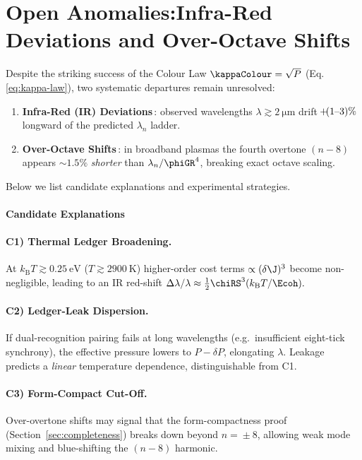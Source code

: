 \documentclass[11pt,oneside]{book}
\begin{document}
{\section{Open Anomalies:\;Infra-Red Deviations and Over-Octave Shifts}
\label{sec:IR-anomalies}

Despite the striking success of the Colour Law
\(
   \kappaColour=\sqrt{P}
\)
(Eq.\,\ref{eq:kappa-law}),
two systematic departures remain unresolved:

\begin{enumerate}[label=\textbf{A\arabic*},leftmargin=*,itemsep=5pt]
\item \textbf{Infra-Red (IR) Deviations}\,:  
      observed wavelengths $\lambda\gtrsim\SI{2}{\micro\metre}$
      drift \(\!+\!(1$–$3)\%\) longward of the predicted
      $\lambda_{n}$ ladder.
\item \textbf{Over-Octave Shifts}\,:  
      in broadband plasmas the fourth overtone
      $(n\!-\!8)$ appears \(\sim1.5\%\) \emph{shorter} than
      \(\lambda_{n}/\phiGR^{4}\), breaking exact octave scaling.
\end{enumerate}

Below we list candidate explanations and experimental strategies.

\paragraph{Candidate Explanations}

\paragraph{C1) Thermal Ledger Broadening.}
At $k_{\mathrm B}T\gtrsim\SI{0.25}{\electronvolt}$
($T\gtrsim\SI{2900}{\kelvin}$)
higher-order cost terms
\(
   \propto(\delta\J)^{3}
\)
become non-negligible, leading to an IR
red-shift\;
\(
   \Delta\lambda/\lambda
   \approx \tfrac12\chiRS^{3}(k_{\mathrm B}T/\Ecoh).
\)

\paragraph{C2) Ledger-Leak Dispersion.}
If dual-recognition pairing fails at long wavelengths
(e.g.\ insufficient eight-tick synchrony),
the effective pressure lowers to
$P-\delta P$, elongating $\lambda$.
Leakage predicts a \emph{linear} temperature dependence,
distinguishable from C1.

\paragraph{C3) Form-Compact Cut-Off.}
Over-overtone shifts may signal that the
form-compactness proof (Section~\ref{sec:completeness})
breaks down beyond $n\!=\!\pm8$,
allowing weak mode mixing and blue-shifting the
$(n\!-\!8)$ harmonic.

}
\end{document}
